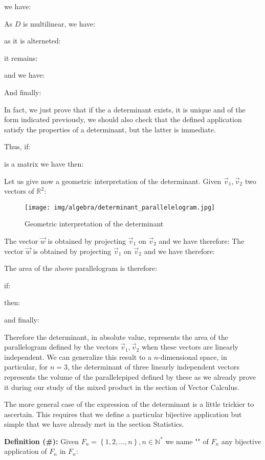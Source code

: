	we have:
	
	As $D$ is multilinear, we have:
	
	as it is alterneted:
	
	it remains:
	
	and we have:
	
	And finally:
	
	In fact, we just prove that if the a determinant exists, it is unique and of the form indicated previously, we should also check that the defined application satisfy the properties of a determinant, but the latter is immediate.
	
	Thus, if:
	
	is a matrix we have then:
	
	Let us give now a geometric interpretation of the determinant. Given $\vec{v}_1,\vec{v}_2$ two vectors of $\mathbb{R}^2$:
	\begin{figure}[H]
		\centering
		\texttt{[image: img/algebra/determinant\_parallelelogram.jpg]}
		\caption{Geometric interpretation of the determinant}
	\end{figure}
	The vector $\vec{w}$ is obtained by projecting $\vec{v}_1$ on $\vec{v}_2$ and we have therefore:
	The vector $\vec{w}$ is obtained by projecting $\vec{v}_1$ on $\vec{v}_2$ and we have therefore:
	
	The area of the above parallelogram is therefore:
		
	if:
	
	then:
	
	and finally:
	
	Therefore the determinant, in absolute value, represents the area of the parallelogram defined by the vectors $\vec{v}_1,\vec{v}_2$ when these vectors are linearly independent. We can generalize this result to a $n$-dimensional space, in particular, for $n=3$, the determinant of three linearly independent vectors represents the volume of the parallelepiped defined by these as we already prove it during our study of the mixed product in the section of Vector Calculus.
	
	The more general case of the expression of the determinant is a little trickier to ascertain. This requires that we define a particular bijective application but simple that we have already met in the section Statistics.
	
	\textbf{Definition (\#\mydef):} Given $F_n=\left\lbrace 1,2,...,n\right\rbrace,n\in \mathbb{N}^{*}$ we name "" of $F_n$ any bijective application of $F_n$ in $F_n$:
	
